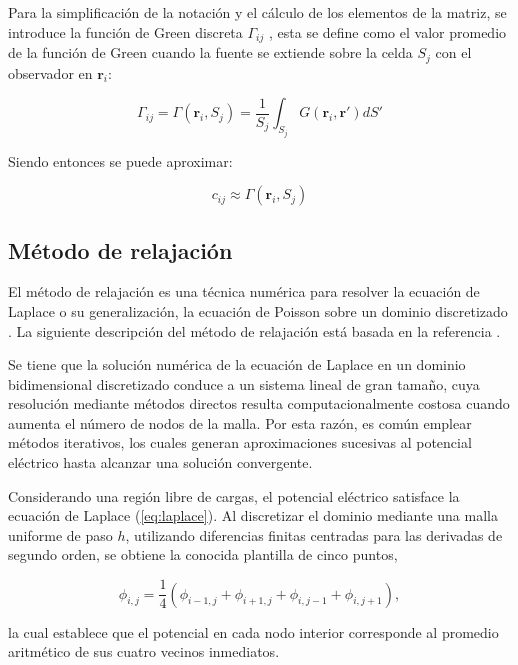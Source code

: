 \documentclass[12pt, twocolumn]{article}
\begin{document}
Para la simplificación de la notación y el cálculo de los elementos de la matriz, se introduce la función de Green discreta $\Gamma_{ij}$ \cite{MoM}, esta se define como el valor promedio de la función de Green cuando la fuente se extiende sobre la celda $S_j$ con el observador en $\mathbf{r}_i$:

\begin{equation*}
    \Gamma_{ij} = \Gamma(\mathbf{r}_i,S_j) = \frac{1}{S_j} \int_{S_j} G(\mathbf{r}_i,\mathbf{r'}) dS'
\end{equation*}

Siendo entonces se puede aproximar:

\begin{equation*}
    c_{ij} \approx \Gamma(\mathbf{r}_i,S_j)
\end{equation*}


\subsection{Método de relajación}

El método de relajación es una técnica numérica para resolver la ecuación de Laplace o su generalización, la ecuación de Poisson sobre un dominio discretizado \cite{WikipediaRelaxation}. La siguiente descripción del método de relajación está basada en la referencia
\cite{ZinCin2026}.

Se tiene que la solución numérica de la ecuación de Laplace en un dominio bidimensional discretizado conduce a un sistema lineal de gran tamaño, cuya resolución mediante métodos directos resulta computacionalmente costosa cuando aumenta el número de nodos de la malla. Por esta razón, es común emplear métodos iterativos, los cuales generan aproximaciones sucesivas al potencial eléctrico hasta alcanzar una solución convergente.

Considerando una región libre de cargas, el potencial eléctrico satisface la ecuación de Laplace (\ref{eq:laplace}). Al discretizar el dominio mediante una malla uniforme de paso $h$, utilizando diferencias finitas centradas para las derivadas de segundo orden, se obtiene la conocida plantilla de cinco puntos,

\begin{equation}
\phi_{i,j}
=
\frac{1}{4}
\left(
\phi_{i-1,j}
+
\phi_{i+1,j}
+
\phi_{i,j-1}
+
\phi_{i,j+1}
\right),
\label{eq:laplace_discreta}
\end{equation}

la cual establece que el potencial en cada nodo interior corresponde al promedio aritmético de sus cuatro vecinos inmediatos.
\end{document}

